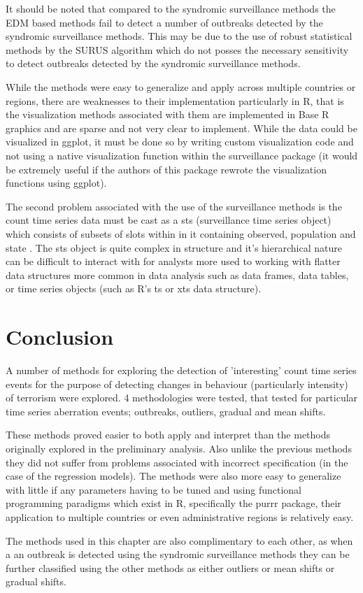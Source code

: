 It should be noted that compared to the syndromic surveillance methods the EDM based methods fail to detect a number of outbreaks detected by the syndromic surveillance methods. This may be due to the use of robust statistical methods by the SURUS algorithm which do not posses the necessary sensitivity to detect outbreaks detected by the syndromic surveillance methods. 

While the methods were easy to generalize and apply across multiple countries or regions, there are weaknesses to their implementation particularly in R, that is the visualization methods associated with them are implemented in Base R graphics and are sparse and not very clear to implement. While the data could be visualized in ggplot, it must be done so by writing custom visualization code and not using a native visualization function within the surveillance package (it would be extremely useful if the authors of this package rewrote the visualization functions using ggplot). 

The second problem associated with the use of the surveillance methods is the count time series data must be cast as a sts (surveillance time series object) which consists of subsets of slots within in it containing observed, population and state \citep{hohle2007r}. The sts object is quite complex in structure and it’s hierarchical nature can be difficult to interact with for analysts more used to working with flatter data structures more common in data analysis such as data frames, data tables, or time series objects (such as R’s ts or xts data structure).

\section{Conclusion}

A number of methods for exploring the detection of 'interesting' count time series events for the purpose of detecting changes in behaviour (particularly intensity) of terrorism were explored. 4 methodologies were tested, that tested for particular time series aberration events; outbreaks, outliers, gradual and mean shifts.  

These methods proved easier to both apply and interpret than the methods originally explored in the preliminary analysis. Also unlike the previous methods they did not suffer from problems associated with incorrect specification (in the case of the regression models). The methods were also more easy to generalize with little if any parameters having to be tuned and using functional programming paradigms which exist in R, specifically the purrr package, their application to multiple countries or even administrative regions is relatively easy.

The methods used in this chapter are also complimentary to each other, as when a an outbreak is detected using the syndromic surveillance methods they can be further classified using the other methods as either outliers or mean shifts or gradual shifts.

